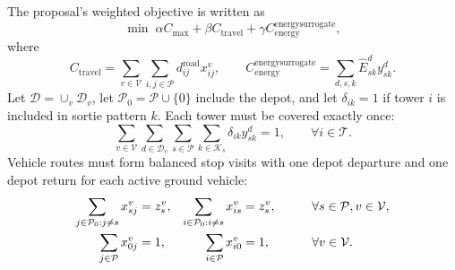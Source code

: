 \documentclass[preprint,12pt,number]{elsarticle}
\begin{document}
The proposal's weighted objective is written as
\begin{equation}
\min \; \alpha C_{\max}+\beta C_{\mathrm{travel}}+\gamma C_{\mathrm{energy}}^{\mathrm{energy surrogate}},
\label{eq:objective}
\end{equation}
where
\begin{equation}
C_{\mathrm{travel}}=\sum_{v\in\mathcal{V}}\sum_{i,j\in\mathcal{P}} d^{\mathrm{road}}_{ij}x^v_{ij},
\qquad
C_{\mathrm{energy}}^{\mathrm{energy surrogate}}=\sum_{d,s,k}\hat E^d_{sk}y^d_{sk}.
\end{equation}
Let $\mathcal{D}=\cup_v\mathcal{D}_v$, let $\mathcal{P}_0=\mathcal{P}\cup\{0\}$ include the depot, and let $\delta_{ik}=1$ if tower $i$ is included in sortie pattern $k$. Each tower must be covered exactly once:
\begin{equation}
\sum_{v\in\mathcal{V}}\sum_{d\in\mathcal{D}_v}\sum_{s\in\mathcal{P}}\sum_{k\in\mathcal{K}_s}\delta_{ik}y^d_{sk}=1,\qquad \forall i\in\mathcal{T}.
\label{eq:tower-coverage}
\end{equation}
Vehicle routes must form balanced stop visits with one depot departure and one depot return for each active ground vehicle:
\begin{align}
\sum_{j\in\mathcal{P}_0:j\ne s}x^v_{sj} &= z_s^v,&
\sum_{i\in\mathcal{P}_0:i\ne s}x^v_{is} &= z_s^v,\qquad &&\forall s\in\mathcal{P},v\in\mathcal{V},\notag\\
\sum_{j\in\mathcal{P}}x^v_{0j} &= 1,&
\sum_{i\in\mathcal{P}}x^v_{i0} &= 1,\qquad &&\forall v\in\mathcal{V}.
\label{eq:vehicle-flow}
\end{align}
\end{document}

